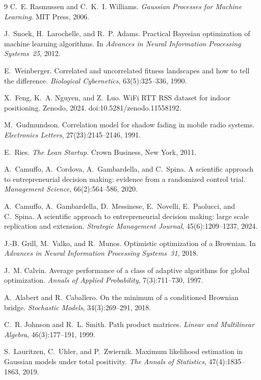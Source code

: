\documentclass[11pt]{article}
\theoremstyle{itheads}
\begin{document}
\begin{thebibliography}{9}
C.~E. Rasmussen and C.~K.~I. Williams.
\emph{Gaussian Processes for Machine Learning}.
MIT Press, 2006.

J.~Snoek, H.~Larochelle, and R.~P. Adams.
Practical Bayesian optimization of machine learning algorithms.
In \emph{Advances in Neural Information Processing Systems~25}, 2012.

E.~Weinberger.
Correlated and uncorrelated fitness landscapes and how to tell the
difference.
\emph{Biological Cybernetics}, 63(5):325--336, 1990.

X.~Feng, K.~A. Nguyen, and Z.~Luo.
WiFi RTT RSS dataset for indoor positioning.
Zenodo, 2024. doi:10.5281/zenodo.11558192.

M.~Gudmundson.
Correlation model for shadow fading in mobile radio systems.
\emph{Electronics Letters}, 27(23):2145--2146, 1991.

E.~Ries.
\emph{The Lean Startup}.
Crown Business, New York, 2011.

A.~Camuffo, A.~Cordova, A.~Gambardella, and C.~Spina.
A scientific approach to entrepreneurial decision making: evidence
from a randomized control trial.
\emph{Management Science}, 66(2):564--586, 2020.

A.~Camuffo, A.~Gambardella, D.~Messinese, E.~Novelli, E.~Paolucci,
and C.~Spina.
A scientific approach to entrepreneurial decision making: large
scale replication and extension.
\emph{Strategic Management Journal}, 45(6):1209--1237, 2024.

J.-B. Grill, M.~Valko, and R.~Munos.
Optimistic optimization of a Brownian.
In \emph{Advances in Neural Information Processing Systems~31}, 2018.

J.~M. Calvin.
Average performance of a class of adaptive algorithms for global
optimization.
\emph{Annals of Applied Probability}, 7(3):711--730, 1997.

A.~Alabert and R.~Caballero.
On the minimum of a conditioned Brownian bridge.
\emph{Stochastic Models}, 34(3):269--291, 2018.

C.~R. Johnson and R.~L. Smith.
Path product matrices.
\emph{Linear and Multilinear Algebra}, 46(3):177--191, 1999.

S.~Lauritzen, C.~Uhler, and P.~Zwiernik.
Maximum likelihood estimation in Gaussian models under total positivity.
\emph{The Annals of Statistics}, 47(4):1835--1863, 2019.



\end{thebibliography}
\end{document}
